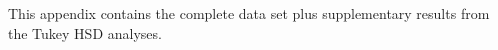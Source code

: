 \renewcommand\thefigure{A\arabic{figure}}
\renewcommand\thetable{A\arabic{table}}
\setcounter{figure}{0}
\setcounter{table}{0}





\noindent This appendix contains the complete data set plus supplementary results from the Tukey HSD analyses.





\clearpage

